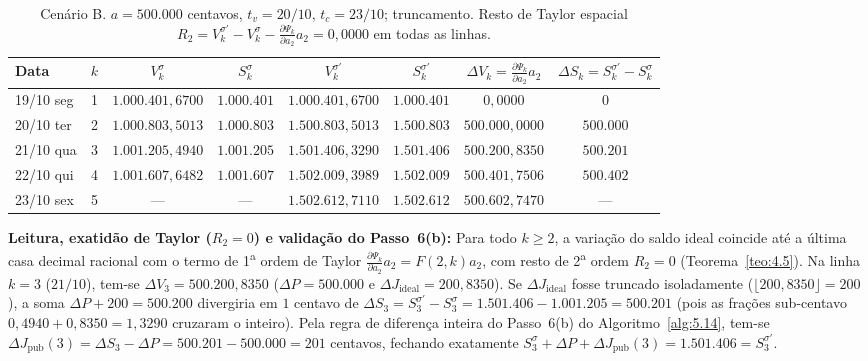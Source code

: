 \documentclass[11pt, a4paper]{article}
\theoremstyle{definition}
\theoremstyle{plain}
\theoremstyle{remark}
\begin{document}
\begin{table}[htbp]
\centering
\small
\begin{tabular}{@{}lccccccc@{}}
\toprule
\textbf{Data} & $k$ & $V_k^\sigma$ & $S_k^\sigma$ & $V_k^{\sigma'}$ & $S_k^{\sigma'}$ & $\Delta V_k = \frac{\partial \Psi_k}{\partial a_2}a_2$ & $\Delta S_k = S_k^{\sigma'} - S_k^\sigma$ \\
\midrule
19/10 seg & 1 & $1.000.401{,}6700$ & $1.000.401$ & $1.000.401{,}6700$ & $1.000.401$ & $0{,}0000$       & $0$ \\
20/10 ter & 2 & $1.000.803{,}5013$ & $1.000.803$ & $1.500.803{,}5013$ & $1.500.803$ & $500.000{,}0000$ & $500.000$ \\
21/10 qua & 3 & $1.001.205{,}4940$ & $1.001.205$ & $1.501.406{,}3290$ & $1.501.406$ & $500.200{,}8350$ & $500.201$ \\
22/10 qui & 4 & $1.001.607{,}6482$ & $1.001.607$ & $1.502.009{,}3989$ & $1.502.009$ & $500.401{,}7506$ & $500.402$ \\
23/10 sex & 5 & ---                & ---         & $1.502.612{,}7110$ & $1.502.612$ & $500.602{,}7470$ & --- \\
\bottomrule
\end{tabular}
\caption{Cenário B. $a = 500.000$ centavos, $t_v = 20/10$, $t_c = 23/10$; truncamento. Resto de Taylor espacial $R_2 = V_k^{\sigma'} - V_k^\sigma - \frac{\partial \Psi_k}{\partial a_2}a_2 = 0{,}0000$ em todas as linhas.}
\label{tab:7}
\end{table}

\textbf{Leitura, exatidão de Taylor ($R_2 = 0$) e validação do Passo~6(b):} Para todo $k \ge 2$, a variação do saldo ideal coincide até a última casa decimal racional com o termo de 1\textsuperscript{a} ordem de Taylor $\frac{\partial \Psi_k}{\partial a_2}a_2 = F(2,k)a_2$, com resto de 2\textsuperscript{a} ordem $R_2 = 0$ (Teorema~\ref{teo:4.5}). Na linha $k=3$ ($21/10$), tem-se $\Delta V_3 = 500.200{,}8350$ ($\Delta P = 500.000$ e $\Delta J_{\text{ideal}} = 200{,}8350$). Se $\Delta J_{\text{ideal}}$ fosse truncado isoladamente ($\lfloor 200{,}8350 \rfloor = 200$), a soma $\Delta P + 200 = 500.200$ divergiria em $1$ centavo de $\Delta S_3 = S_3^{\sigma'} - S_3^\sigma = 1.501.406 - 1.001.205 = 500.201$ (pois as frações sub-centavo $0{,}4940 + 0{,}8350 = 1{,}3290$ cruzaram o inteiro). Pela regra de diferença inteira do Passo~6(b) do Algoritmo~\ref{alg:5.14}, tem-se $\Delta J_{\text{pub}}(3) = \Delta S_3 - \Delta P = 500.201 - 500.000 = 201$ centavos, fechando exatamente $S_3^\sigma + \Delta P + \Delta J_{\text{pub}}(3) = 1.501.406 = S_3^{\sigma'}$.
\end{document}
